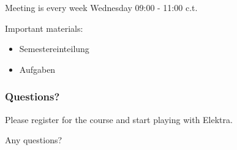 \begin{frame}
	Meeting is every week Wednesday 09:00 - 11:00 c.t.

	Important materials:
	\begin{itemize}
	\item Semestereinteilung
	\item Aufgaben
	\end{itemize}
\end{frame}

\begin{assignment}
	\frametitle{Questions?}
	\begin{task}
	Please register for the course and start playing with Elektra.
	\end{task}

	\begin{task}
	Any questions?
	\end{task}
\end{assignment}



\nocite{raab2017introducing}

\appendix

\begin{frame}[allowframebreaks]
	
	
\end{frame}





